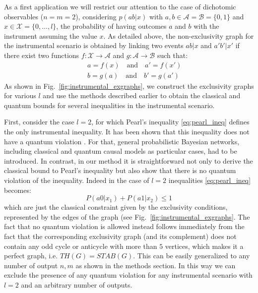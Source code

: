 \documentclass[letterpaper]{article}
\begin{document}
As a first application we will restrict our attention to the case of
dichotomic observables ($n = m = 2$), considering $p(ab|x)$ with $a, b \in
\mathcal{A} = \mathcal{B} = \{0,1\}$ and $x \in
\mathcal{X} = \{0,\ldots,l\}$, the probability of having outcomes $a$ and $b$
with the instrument assuming the value $x$. As detailed above, the
non-exclusivity graph for the instrumental scenario is obtained by linking two
events $ab|x$ and $a'b'|x'$ if there exist two functions $f:\mathcal{X}
\rightarrow \mathcal{A}$ and $g:\mathcal{A} \rightarrow
\mathcal{B}$ such that:
\begin{eqnarray}
   & &  a = f(x) \quad\text{and}\quad a'=f(x')\\ \nonumber
   & & b = g(a) \quad\text{and}\quad b'=g(a')
    \label{eq:non_exclusivity_condition}
\end{eqnarray}
As shown in Fig.~\ref{fig:instrumental_exgraphs}, we construct the exclusivity
graphs for various $l$ and use the methods described earlier to
obtain the classical and quantum bounds for several inequalities in the
instrumental scenario. 

First, consider the case $l=2$, for which Pearl's inequality
\eqref{eq:pearl_ineq} defines the only instrumental inequality. It has been
shown that this inequality does not have a quantum violation \cite{}.
For that, general probabilistic Bayesian networks, including classical and
quantum causal models as particular cases, had to be introduced.
In contrast, in our method it is straightforward not only to derive the
classical bound to Pearl's inequality but also show that there is no quantum
violation of the inequality. 
Indeed in the case of $l=2$ inequalities \eqref{eq:pearl_ineq} becomes:
\begin{equation}
    P(a0|x_1) + P(a1|x_2) \le 1 
    \label{eq:pearl_ineq_222}
\end{equation}
which are just the classical constraint given by the exclusivity conditions,
represented by the edges of the graph (see Fig.~\ref{fig:instrumental_exgraphs}.
The fact that no quantum violation is allowed instead 
follows immediately from the fact that the corresponding
exclusivity graph (and its complement) does not contain any odd cycle or
anticycle with more than $5$ vertices, which makes it a perfect graph, i.e.
$TH(G) = STAB(G)$.
This can be easily generalized to any number of output $n,m$ as shown in the
methods section. In this way we can exclude the presence of any quantum
violation for any instrumental scenario with $l=2$ and an arbitrary number of
outputs.
\end{document}
